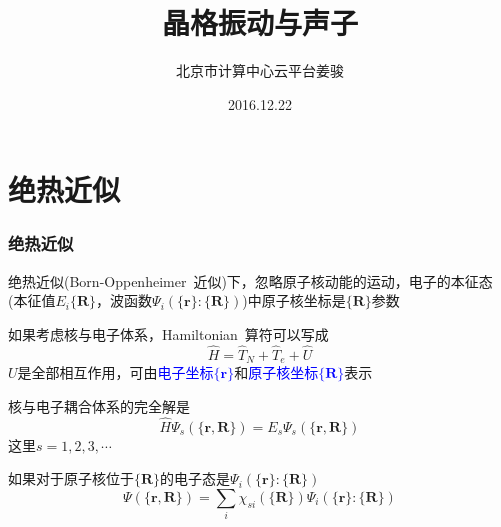 \documentclass[cjk,slidestop,compress,mathserif,blue]{beamer}
\begin{document}

\title{晶格振动与声子}

\author{北京市计算中心\;云平台\:姜骏}
\date{\textrm{2016.12.22}}
\frame{\titlepage}

\section*{}

\small
\section{绝热近似}
\frame
{
	\frametitle{绝热近似}
	绝热近似(\textrm{Born-Oppenheimer~}近似)下，忽略原子核动能的运动，电子的本征态(本征值$E_i\{\mathbf{R}\}$，波函数$\Psi_i(\{\mathbf{r}\}:\{\mathbf{R}\})$)中原子核坐标是$\{\mathbf{R}\}$参数

	如果考虑核与电子体系，\textrm{Hamiltonian~}算符可以写成
	\begin{displaymath}
		\hat H=\hat T_N+\hat T_e+\hat U
	\end{displaymath}
	$U$是全部相互作用，可由\textcolor{blue}{电子坐标$\{\mathbf{r}\}$}和\textcolor{blue}{原子核坐标$\{\mathbf{R}\}$}表示

	核与电子耦合体系的完全解是
	\begin{displaymath}
		\hat H\Psi_s(\{\mathbf{r},\mathbf{R}\})=E_s\Psi_s(\{\mathbf{r},\mathbf{R}\})
	\end{displaymath}
	这里$s=1,2,3,\cdots$

	如果对于原子核位于$\{\mathbf{R}\}$的电子态是$\Psi_i(\{\mathbf{r}\}:\{\mathbf{R}\})$
	\begin{displaymath}
		\Psi(\{\mathbf{r},\mathbf{R}\})=\sum_i\chi_{si}(\{\mathbf{R}\})\Psi_i(\{\mathbf{r}\}:\{\mathbf{R}\})
	\end{displaymath}
}
\end{document}
